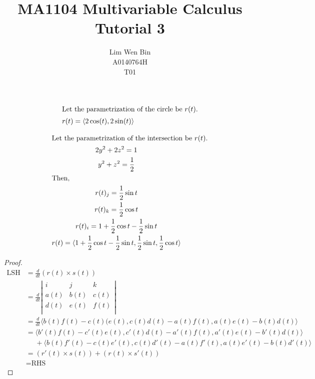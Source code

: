 \documentclass[12pt]{article}
\newenvironment{problem}[2][Problem]{\begin{trivlist}
\item[\hskip \labelsep {\bfseries #1}\hskip \labelsep {\bfseries #2.}]}{\end{trivlist}}
\begin{document}
\title{MA1104 Multivariable Calculus Tutorial 3}
\author{Lim Wen Bin \\
A0140764H\\
T01}
\maketitle

\begin{problem}{1.a}
\end{problem}
\begin{gather*}
	\intertext{Let the parametrization of the circle be $r(t)$.}
	r(t) = \langle 2\cos(t), 2\sin(t) \rangle 
\end{gather*}
\filbreak

\begin{problem}{1.b}
\end{problem}
\begin{gather*}
	\intertext{Let the parametrization of the intersection be $r(t)$.}
	2y^2 + 2z^2 = 1 \\
	y^2 + z^2 = \frac{1}{2} \\
	\shortintertext{Then,}
	r(t)_j = \frac{1}{2} \sin t \\ 
	r(t)_k = \frac{1}{2} \cos t \\ 
	r(t)_i = 1 + \frac{1}{2} \cos t - \frac{1}{2} \sin t \\ 
	r(t) = \langle 1 + \frac{1}{2} \cos t - \frac{1}{2} \sin t, \frac{1}{2} \sin t,
	\frac{1}{2} \cos t \rangle  \\ 
\end{gather*}
\filbreak

\begin{problem}{2}
\end{problem}
\begin{proof}
\begin{align*}
	\text{LSH} &= \frac{d}{dt}(r(t) \times s(t)) \\
	&= \frac{d}{dt} 
	\left| \begin{array}{ccc}
		i & j & k\\
		a(t) & b(t) & c(t)\\
		d(t) & e(t) & f(t)\\
	\end{array} \right| \\
	&= \frac{d}{dt} \langle b(t)f(t) - c(t)(e(t), c(t)d(t) - a(t)f(t), 
	a(t)e(t) - b(t)d(t) \rangle \\
	&= \langle b'(t)f(t) - c'(t)e(t), c'(t)d(t) - a'(t)f(t), 
	a'(t)e(t) - b'(t)d(t) \rangle \\
	&\phantom{=} + \langle b(t)f'(t) - c(t)e'(t), c(t)d'(t) - a(t)f'(t), 
	a(t)e'(t) - b(t)d'(t) \rangle \\
	&= (r'(t) \times s(t)) + (r(t) \times s'(t))\\
	&= \text{RHS}
\end{align*}
\end{proof}
\filbreak
\end{document}
